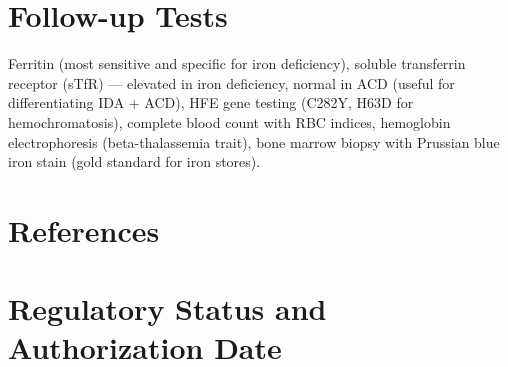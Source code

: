 \section*{Follow-up Tests}
Ferritin (most sensitive and specific for iron deficiency), soluble transferrin receptor (sTfR) --- elevated in iron deficiency, normal in ACD (useful for differentiating IDA + ACD), HFE gene testing (C282Y, H63D for hemochromatosis), complete blood count with RBC indices, hemoglobin electrophoresis (beta-thalassemia trait), bone marrow biopsy with Prussian blue iron stain (gold standard for iron stores).
\section*{References}


\clearpage
\section*{Regulatory Status and Authorization Date}

\clearpage
